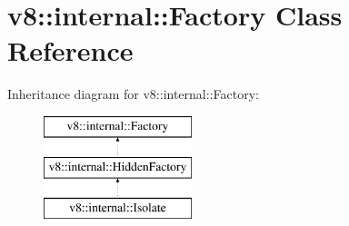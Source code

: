 \hypertarget{classv8_1_1internal_1_1Factory}{}\section{v8\+:\+:internal\+:\+:Factory Class Reference}
\label{classv8_1_1internal_1_1Factory}
Inheritance diagram for v8\+:\+:internal\+:\+:Factory\+:\begin{figure}[H]
\begin{center}
\leavevmode
\includegraphics[height=3.000000cm]{classv8_1_1internal_1_1Factory}
\end{center}
\end{figure}
